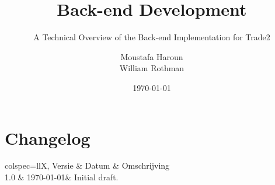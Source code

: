 \documentclass[fleqn,12pt]{article}
\title{Back-end Development}
\subtitle{A Technical Overview of the Back-end Implementation for Trade2}
\author{Moustafa Haroun\\William Rothman} %
\date{\today}
\begin{document}
\maketitle

\newpage
\section{Changelog}\label{sec:changelog}

\begin{htable}[
		caption = {Changelog},
		label = {tab:changelog},
	]{
		colspec={llX},
	}
	Versie & Datum & Omschrijving \\
	1.0 & \today & Initial draft. \\
\end{htable}

\newpage
\tableofcontents

\newpage




% 

% 

% 

% 

% 

\newpage


\newpage
\printbibliography
\end{document}
